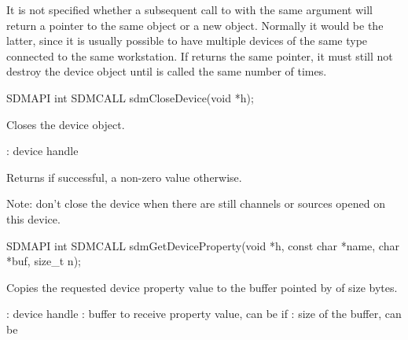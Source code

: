 \documentclass[a4paper,12pt,twoside,extrafontsizes]{memoir}
\begin{document}
\begin{funcremarks}
	It is not specified whether a subsequent call to  with the same  argument will return a pointer to the same object or a new object. Normally it would be the latter, since it is usually possible to have multiple devices of the same type connected to the same workstation. If  returns the same pointer, it must still not destroy the device object until  is called the same number of times.
\end{funcremarks}



\begin{cfuncprototype}
SDMAPI int SDMCALL sdmCloseDevice(void *h);
\end{cfuncprototype}

\begin{funcdescr}
	Closes the device object.
\end{funcdescr}

\begin{funcparams}
	: device handle
\end{funcparams}

\begin{funcret}
	Returns  if successful, a non-zero value otherwise.
\end{funcret}

\begin{funcremarks}
	Note: don't close the device when there are still channels or sources opened on this device.
\end{funcremarks}



\begin{cfuncprototype}
SDMAPI int SDMCALL sdmGetDeviceProperty(void *h, const char *name, char *buf, size_t n);
\end{cfuncprototype}

\begin{funcdescr}
	Copies the requested device property value to the buffer pointed by  of size  bytes.
\end{funcdescr}

\begin{funcparams}
	: device handle
	: buffer to receive property value, can be  if 
	: size of the buffer, can be 
\end{funcparams}
\end{document}
